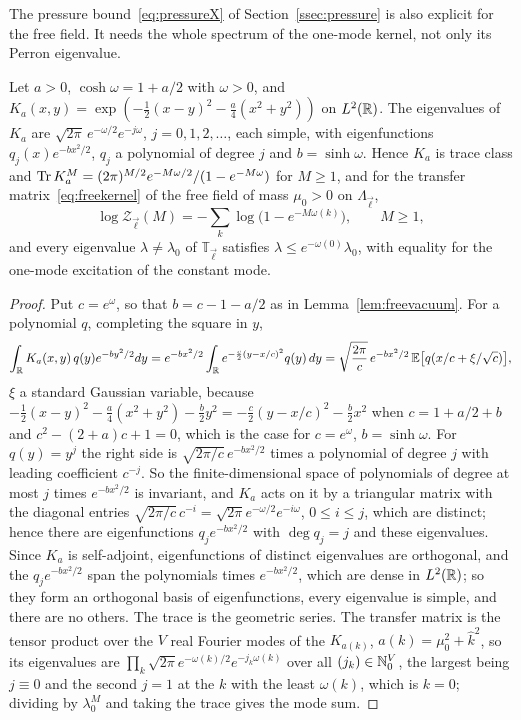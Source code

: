 The pressure bound~\eqref{eq:pressureX} of Section~\ref{ssec:pressure}
is also explicit for the free field. It needs the whole spectrum of the
one-mode kernel, not only its Perron eigenvalue.

\begin{lemma}\label{lem:freemodes}
Let $a>0$, $\cosh\omega=1+a/2$ with $\omega>0$, and $K_a(x,y)=\exp(-\frac12
(x-y)^2-\frac a4(x^2+y^2))$ on $L^2(\mathbb{R})$. The eigenvalues of $K_a$ are
$\sqrt{2\pi}\,e^{-\omega/2}e^{-j\omega}$, $j=0,1,2,\dots$, each simple, with
eigenfunctions $q_j(x)e^{-bx^2/2}$, $q_j$ a polynomial of degree $j$ and
$b=\sinh\omega$. Hence $K_a$ is trace class and $\operatorname{Tr} K_a^M=(2\pi)^{M/2}e^{-M
\omega/2}/(1-e^{-M\omega})$ for $M\ge1$, and for the transfer
matrix~\eqref{eq:freekernel} of the free field of mass $\mu_0>0$ on
$\Lambda_{\vec\ell}$,
\[
\log\mathcal Z_{\vec\ell}(M)=-\sum_k\log\bigl(1-e^{-M\omega(k)}\bigr),\qquad
M\ge1 ,
\]
and every eigenvalue $\lambda\ne\lambda_0$ of $\mathbb T_{\vec\ell}$
satisfies $\lambda\le e^{-\omega(0)}\lambda_0$, with equality for the one-mode
excitation of the constant mode.
\end{lemma}

\begin{proof}
Put $c=e^\omega$, so that $b=c-1-a/2$ as in Lemma~\ref{lem:freevacuum}. For a
polynomial $q$, completing the square in $y$,
\[
\int_{\mathbb{R}} K_a(x,y)\,q(y)e^{-by^2/2}dy=e^{-bx^2/2}\int_{\mathbb{R}} e^{-\frac c2(y-x/c)^2}
q(y)\,dy=\sqrt{\frac{2\pi}c}\,e^{-bx^2/2}\,\mathbb E\bigl[q(x/c+\xi/\sqrt c)
\bigr],
\]
$\xi$ a standard Gaussian variable, because $-\frac12(x-y)^2-\frac a4(x^2+y^2)
-\frac b2y^2=-\frac c2(y-x/c)^2-\frac b2x^2$ when $c=1+a/2+b$ and $c^2-(2+a)c
+1=0$, which is the case for $c=e^\omega$, $b=\sinh\omega$. For $q(y)=y^j$
the right side is $\sqrt{2\pi/c}\,e^{-bx^2/2}$ times a polynomial of degree
$j$ with leading coefficient $c^{-j}$. So the finite-dimensional space of
polynomials of degree at most $j$ times $e^{-bx^2/2}$ is invariant, and $K_a$
acts on it by a triangular matrix with the diagonal entries $\sqrt{2\pi/c}\,
c^{-i}=\sqrt{2\pi}e^{-\omega/2}e^{-i\omega}$, $0\le i\le j$, which are distinct;
hence there are eigenfunctions $q_je^{-bx^2/2}$ with $\deg q_j=j$ and these
eigenvalues. Since $K_a$ is self-adjoint, eigenfunctions of distinct
eigenvalues are orthogonal, and the $q_je^{-bx^2/2}$ span the polynomials
times $e^{-bx^2/2}$, which are dense in $L^2(\mathbb{R})$; so they form an orthogonal
basis of eigenfunctions, every eigenvalue is simple, and there are no others.
The trace is the geometric series. The transfer matrix is the tensor product
over the $V$ real Fourier modes of the $K_{a(k)}$, $a(k)=\mu_0^2+\hat k^2$, so
its eigenvalues are $\prod_k\sqrt{2\pi}e^{-\omega(k)/2}e^{-j_k\omega(k)}$ over
all $(j_k)\in\mathbb{N}_0^V$, the largest being $j\equiv0$ and the second $j=1$ at the
$k$ with the least $\omega(k)$, which is $k=0$; dividing by $\lambda_0^M$ and
taking the trace gives the mode sum.
\end{proof}

